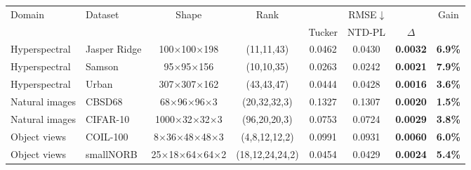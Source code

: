 \begin{tabular}{@{}l l c c c c c c@{}}
\toprule
\multirow{2}{*}{Domain} & \multirow{2}{*}{Dataset} & \multirow{2}{*}{Shape} & \multirow{2}{*}{Rank} & \multicolumn{3}{c}{RMSE$\downarrow$} & \multirow{2}{*}{Gain} \\
\cmidrule(lr){5-7}
& & & & Tucker & NTD-PL & $\Delta$ & \\
\midrule
Hyperspectral & Jasper Ridge & 100$\times$100$\times$198 & (11,11,43) & 0.0462 & 0.0430 & \textbf{0.0032} & \textbf{6.9\%} \\
Hyperspectral & Samson & 95$\times$95$\times$156 & (10,10,35) & 0.0263 & 0.0242 & \textbf{0.0021} & \textbf{7.9\%} \\
Hyperspectral & Urban & 307$\times$307$\times$162 & (43,43,47) & 0.0444 & 0.0428 & \textbf{0.0016} & \textbf{3.6\%} \\
\midrule
Natural images & CBSD68 & 68$\times$96$\times$96$\times$3 & (20,32,32,3) & 0.1327 & 0.1307 & \textbf{0.0020} & \textbf{1.5\%} \\
Natural images & CIFAR-10 & 1000$\times$32$\times$32$\times$3 & (96,20,20,3) & 0.0753 & 0.0724 & \textbf{0.0029} & \textbf{3.8\%} \\
\midrule
Object views & COIL-100 & 8$\times$36$\times$48$\times$48$\times$3 & (4,8,12,12,2) & 0.0991 & 0.0931 & \textbf{0.0060} & \textbf{6.0\%} \\
Object views & smallNORB & 25$\times$18$\times$64$\times$64$\times$2 & (18,12,24,24,2) & 0.0454 & 0.0429 & \textbf{0.0024} & \textbf{5.4\%} \\
\bottomrule
\end{tabular}
